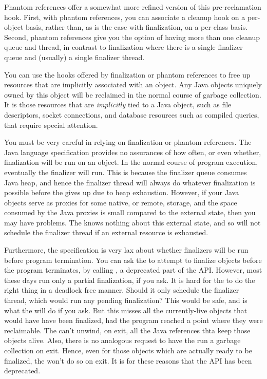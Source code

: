 Phantom references offer a somewhat more refined version of this pre-reclamation
hook. First, with phantom references, you can associate a cleanup hook on a
per-object basis, rather than, as is the case with finalization, on a per-class
basis. Second, phantom references give you the option of having more than one
cleanup queue and thread, in contrast to finalization where there is a single
finalizer queue and (usually) a single finalizer thread.

You can use the hooks offered by finalization or phantom references to free up
resources that are implicitly associated with an object. Any Java objects
uniquely owned by this object will be reclaimed in the normal course of garbage
collection. It is those resources that are \emph{implicitly} tied to a Java
object, such as file descriptors, socket connections, and database resources such
as compiled queries, that require special attention.

You must be very careful in relying on finalization or phantom references. The
Java language specification provides no assurances of how often, or even whether,
finalization will be run on an object. In the normal course of program execution,
eventually the finalizer will run. This is because the finalizer queue consumes
Java heap, and hence the finalizer thread will always do whatever finalization is
possible before the \jre gives up due to heap exhaustion. However, if your Java
objects serve as proxies for some native, or remote, storage, and the space
consumed by the Java proxies is small compared to the external state, then you
may have problems. The \jre knows nothing about this external state, and so will
not schedule the finalizer thread if an external resource is exhausted.

Furthermore, the specification is very lax about whether finalizers will be run
before program termination. You can ask the \jre to attempt to finalize objects
before the program terminates, by calling
, a deprecated part of the API. However,
most \jres these days run only a partial finalization, if you ask. It is hard for
the \jre to do the right thing in a deadlock free manner. Should it only schedule
the finalizer thread, which would run any pending finalization? This would be
safe, and is what the \jre will do if you ask. But this misses all the
currently-live objects that would have have been finalized, had the program
reached a point where they were reclaimable. The \jre can't unwind, on exit, all
the Java references thta keep those objects alive. Also, there is no analogous
request to have the \jre run a garbage collection on exit. Hence, even for those
objects which are actually ready to be finalized, the \jre won't do so on exit.
It is for these reasons that the API has been deprecated.

